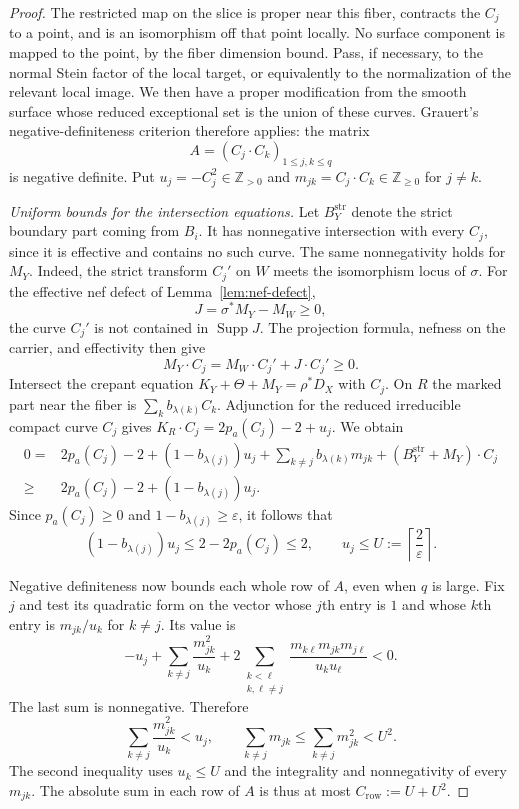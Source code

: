 \documentclass[11pt]{amsart}
\theoremstyle{definition}
\theoremstyle{remark}
\numberwithin{equation}{section}
\newcommand{\Z}{\mathbb{Z}}
\DeclareMathOperator{\Supp}{Supp}
\begin{document}
\begin{proof}
The restricted map on the slice is proper near this fiber, contracts the
$C_j$ to a point, and is an isomorphism off that point locally.  No
surface component is mapped to the point, by the fiber dimension bound.
Pass, if necessary, to the normal Stein factor of the local target, or
equivalently to the normalization of the relevant local image.  We then
have a proper modification from the smooth surface whose reduced
exceptional set is the union of these curves.  Grauert's
negative-definiteness criterion
\cite[Section~4, no.~8(e), pp.~366--367]{Grauert1962} therefore applies:
the matrix
\[
                       A=(C_j\cdot C_k)_{1\leq j,k\leq q}
\]
is negative definite.  Put $u_j=-C_j^2\in\Z_{>0}$ and
$m_{jk}=C_j\cdot C_k\in\Z_{\geq0}$ for $j\ne k$.

\medskip\noindent\emph{Uniform bounds for the intersection equations.}
Let $B_Y^{\mathrm{str}}$ denote the strict boundary part coming from
$B_i$.  It has nonnegative intersection with every $C_j$, since it is
effective and contains no such curve.  The same nonnegativity holds for
$M_Y$.  Indeed, the strict transform $C_j'$ on $W$ meets the isomorphism
locus of $\sigma$.  For the effective nef defect of
Lemma~\ref{lem:nef-defect},
\[
                         J=\sigma^*M_Y-M_W\geq0,
\]
the curve $C_j'$ is not contained in $\Supp J$.  The projection formula,
nefness on the carrier, and effectivity then give
\[
                 M_Y\cdot C_j=M_W\cdot C_j'+J\cdot C_j'\geq0.
\]
Intersect the crepant equation
$K_Y+\Theta+M_Y=\rho^*D_X$ with $C_j$.  On $R$ the marked part near the
fiber is $\sum_k b_{\lambda(k)}C_k$.  Adjunction for the reduced
irreducible compact curve $C_j$ gives
$K_R\cdot C_j=2p_a(C_j)-2+u_j$.  We obtain
\begin{align*}
 0={}&2p_a(C_j)-2+(1-b_{\lambda(j)})u_j
       +\sum_{k\ne j}b_{\lambda(k)}m_{jk}
       +(B_Y^{\mathrm{str}}+M_Y)\cdot C_j\\
 \geq{}&2p_a(C_j)-2+(1-b_{\lambda(j)})u_j.
\end{align*}
Since $p_a(C_j)\geq0$ and
$1-b_{\lambda(j)}\geq\varepsilon$, it follows that
\begin{equation}\label{eq:surface-self-intersection-bound}
 (1-b_{\lambda(j)})u_j\leq2-2p_a(C_j)\leq2,
 \qquad u_j\leq U:=\left\lceil\frac2\varepsilon\right\rceil.
\end{equation}

Negative definiteness now bounds each whole row of $A$, even when $q$ is
large.  Fix $j$ and test its quadratic form on the vector whose $j$th
entry is $1$ and whose $k$th entry is $m_{jk}/u_k$ for $k\ne j$.  Its
value is
\[
 -u_j+\sum_{k\ne j}\frac{m_{jk}^2}{u_k}
 +2\sum_{\substack{k<\ell\\k,\ell\ne j}}
   \frac{m_{k\ell}m_{jk}m_{j\ell}}{u_ku_\ell}<0.
\]
The last sum is nonnegative.  Therefore
\begin{equation}\label{eq:surface-row-bound}
 \sum_{k\ne j}\frac{m_{jk}^2}{u_k}<u_j,
 \qquad
 \sum_{k\ne j}m_{jk}\leq\sum_{k\ne j}m_{jk}^2<U^2.
\end{equation}
The second inequality uses $u_k\leq U$ and the integrality and
nonnegativity of every $m_{jk}$.  The absolute sum in each row of $A$ is
thus at most $C_{\mathrm{row}}:=U+U^2$.


\end{proof}
\end{document}
